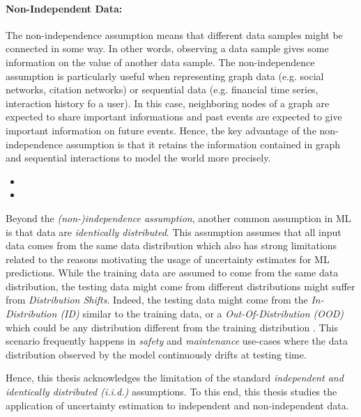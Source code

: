 \paragraph*{Non-Independent Data:} The non-independence assumption means that different data samples might be connected in some way. In other words, observing a data sample gives some information on the value of another data sample.
The non-independence assumption is particularly useful when representing graph data (e.g. social networks, citation networks) or sequential data (e.g. financial time series, interaction history fo a user).
In this case, neighboring nodes of a graph are expected to share important informations and past events are expected to give important information on future events.
Hence, the key advantage of the non-independence assumption is that it retains the information contained in graph and sequential interactions to model the world more precisely.

\begin{itemize}
    \item {}
    \item {}
\end{itemize}

Beyond the \emph{(non-)independence assumption}, another common assumption in ML is that data are \emph{identically distributed}. 
This assumption assumes that all input data comes from the same data distribution which also has strong limitations related to the reasons motivating the usage of uncertainty estimates for ML predictions.
While the training data are assumed to come from the same data distribution, the testing data might come from different distributions might suffer from \emph{Distribution Shifts}. 
Indeed, the testing data might come from the \emph{In-Distribution (ID)} similar to the training data, or a \emph{Out-Of-Distribution (OOD)} which could be any distribution different from the training distribution .
This scenario frequently happens in \emph{safety} and \emph{maintenance} use-cases where the data distribution observed by the model continuously drifts at testing time. 

Hence, this thesis acknowledges the limitation of the standard \emph{independent and identically distributed (i.i.d.)} assumptions.
To this end, this thesis studies the application of uncertainty estimation to independent and non-independent data.

